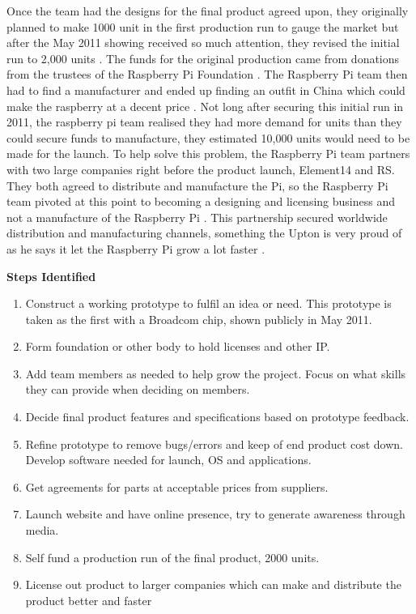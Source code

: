 Once the team had the designs for the final product agreed upon, they originally planned to make 1000 unit in the first production run to gauge the market
\cite{RN139} but after the May 2011 showing received so much attention, they revised the initial run to 2,000 units \cite{RN98}. The funds for the original production came from donations from the trustees of the Raspberry Pi Foundation 
\cite{RN142}. The Raspberry Pi team then had to find a manufacturer and ended up finding an outfit in China which could make the raspberry at a decent price \cite{RN98}. Not long after securing this initial run in 2011, the raspberry pi team realised they had more demand for units than they could secure funds to manufacture, they estimated 10,000 units would need to be made for the launch. To help solve this problem, the Raspberry Pi team partners with two large companies right before the product launch, Element14 and RS. They both agreed to distribute and manufacture the Pi, so the Raspberry Pi team pivoted at this point to becoming a designing and licensing business and not a manufacture of the Raspberry Pi 
\cite{RN98}. This partnership secured worldwide distribution and manufacturing channels, something the Upton is very proud of as he says it let the Raspberry Pi grow a lot faster \cite{RN98}.

\textbf{Steps Identified}\\
\begin{enumerate}
\item Construct a working prototype to fulfil an idea or need. This prototype is taken as the first with a Broadcom chip, shown publicly in May 2011.
\item Form foundation or other body to hold licenses and other IP.
\item Add team members as needed to help grow the project. Focus on what skills they can provide when deciding on members.
\item Decide final product features and specifications based on prototype feedback.
\item Refine prototype to remove bugs/errors and keep of end product cost down. Develop software needed for launch, OS and applications.
\item Get agreements for parts at acceptable prices from suppliers.
\item Launch website and have online presence, try to generate awareness through media.
\item Self fund a production run of the final product, 2000 units.
\item License out product to larger companies which can make and distribute the product better and faster
\end{enumerate} 


